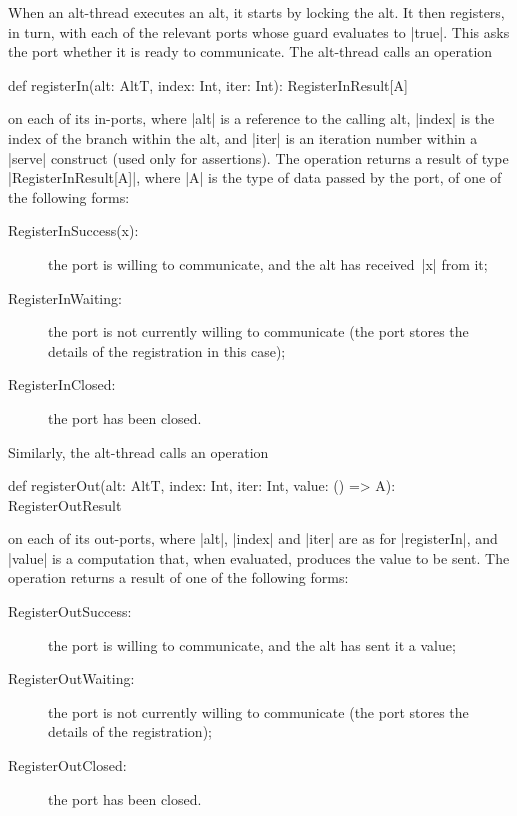 When an alt-thread executes an alt, it starts by locking the alt.  It then
registers, in turn, with each of the relevant ports whose guard evaluates to
|true|.  This asks the port whether it is ready to communicate.  The
alt-thread calls an operation
%
\begin{scala}
def registerIn(alt: AltT, index: Int, iter: Int): RegisterInResult[A]  
\end{scala}
%
on each of its in-ports, where |alt| is a reference to the calling alt, |index|
is the index of the branch within the alt, and |iter| is an iteration number
within a |serve| construct (used only for assertions).  
The operation returns a
result of type |RegisterInResult[A]|, where |A| is the type of data passed by
the port, of one of the following forms:
%
\begin{description}
\item[\rm{\scalastyle RegisterInSuccess(x)}:] the port is willing to
  communicate, and the alt has received~|x| from it;

\item[\rm{\scalastyle RegisterInWaiting}:] the port is not currently willing
  to communicate (the port stores the details of the registration in this
  case);

\item[\rm{\scalastyle RegisterInClosed}:] the port has been closed.
\end{description}
%
Similarly, the alt-thread calls an operation
%
\begin{scala}
def registerOut(alt: AltT, index: Int, iter: Int, value: () => A): RegisterOutResult
\end{scala}
on each of its out-ports, where |alt|, |index| and |iter| are as for
|registerIn|, and |value| is a computation that, when evaluated, produces the
value to be sent.  The operation returns a result of one of the following
forms:
%
\begin{description}
\item[\rm{\scalastyle RegisterOutSuccess}:] the port is willing to
  communicate, and the alt has sent it a value;

\item[\rm{\scalastyle RegisterOutWaiting}:] the port is not currently willing to
  communicate (the port stores the details of the registration); 

\item[\rm{\scalastyle RegisterOutClosed}:] the port has been closed.
\end{description}


